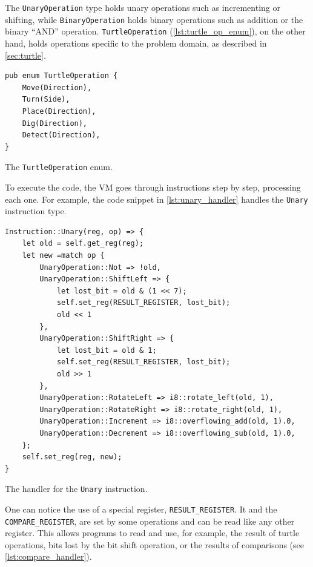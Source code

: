 \documentclass{report}
\newenvironment{code}{\captionsetup{type=listing}}{}
\begin{document}
The \verb|UnaryOperation| type holds unary operations such as incrementing or shifting, while \verb|BinaryOperation| holds binary operations such as addition or the binary ``AND'' operation. \verb|TurtleOperation| (\autoref{lst:turtle_op_enum}), on the other hand, holds operations specific to the problem domain, as described in \autoref{sec:turtle}.

\begin{code}
    \begin{verbatim}
pub enum TurtleOperation {
    Move(Direction),
    Turn(Side),
    Place(Direction),
    Dig(Direction),
    Detect(Direction),
}
    \end{verbatim}
    \caption{The \texttt{TurtleOperation} enum.}
    \label{lst:turtle_op_enum}
\end{code}

To execute the code, the VM goes through instructions step by step, processing each one. For example, the code snippet in \autoref{lst:unary_handler} handles the \verb|Unary| instruction type.

\begin{code}
    \begin{verbatim}
Instruction::Unary(reg, op) => {
    let old = self.get_reg(reg);
    let new =match op {
        UnaryOperation::Not => !old,
        UnaryOperation::ShiftLeft => {
            let lost_bit = old & (1 << 7);
            self.set_reg(RESULT_REGISTER, lost_bit);
            old << 1
        },
        UnaryOperation::ShiftRight => {
            let lost_bit = old & 1;
            self.set_reg(RESULT_REGISTER, lost_bit);
            old >> 1
        },
        UnaryOperation::RotateLeft => i8::rotate_left(old, 1),
        UnaryOperation::RotateRight => i8::rotate_right(old, 1),
        UnaryOperation::Increment => i8::overflowing_add(old, 1).0,
        UnaryOperation::Decrement => i8::overflowing_sub(old, 1).0,
    };
    self.set_reg(reg, new);
}
    \end{verbatim}
    \caption{The handler for the \texttt{Unary} instruction.}
    \label{lst:unary_handler}
\end{code}

One can notice the use of a special register, \verb|RESULT_REGISTER|. It and the \verb|COMPARE_REGISTER|, are set by some operations and can be read like any other register. This allows programs to read and use, for example, the result of turtle operations, bits lost by the bit shift operation, or the results of comparisons (see \autoref{lst:compare_handler}).
\end{document}
